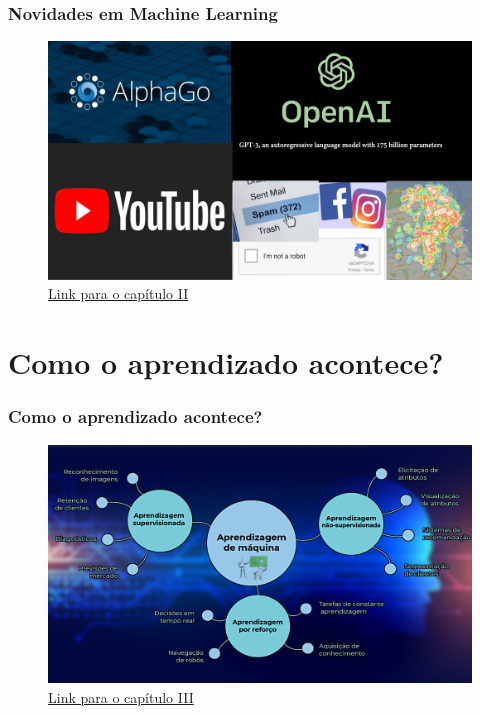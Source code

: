 \documentclass{beamer}
\begin{document}
\begin{frame}

    \frametitle{Novidades em Machine Learning}
    \begin{figure}[ht]
        \centering
        \includegraphics[scale=0.5]{Capitulo2.png}
        \caption{\href{./capitulos/Capitulo_02/Capitulo02.pdf}{Link para o capítulo II}}
    \end{figure}

\end{frame}

\section{Como o aprendizado acontece?}

\begin{frame}

    \frametitle{Como o aprendizado acontece?}
    \begin{figure}[ht]
        \centering
        \includegraphics[scale=0.5]{Capitulo3.png}
        \caption{\href{./capitulos/Capitulo_03/Capitulo03.pdf}{Link para o capítulo III}}
    \end{figure}

\end{frame}
\end{document}
